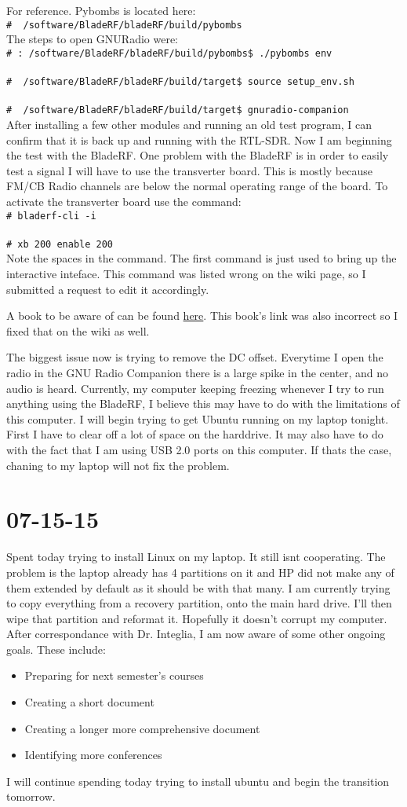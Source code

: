 \documentclass{article}
\newcommand{\shellcmd}[1]{\\\indent\indent\texttt{\footnotesize\# #1}\\}
\begin{document}
	For reference. Pybombs is located here:
	\shellcmd{~/software/BladeRF/bladeRF/build/pybombs}

	The steps to open GNURadio were:
	\shellcmd{:~/software/BladeRF/bladeRF/build/pybombs\$ ./pybombs env}
	\shellcmd{~/software/BladeRF/bladeRF/build/target\$ source setup\_env.sh }
	\shellcmd{~/software/BladeRF/bladeRF/build/target\$ gnuradio-companion} 

	After installing a few other modules and running an old test program, I can confirm that it is back up and running
	with the RTL-SDR. Now I am beginning the test with the BladeRF. One problem with the BladeRF is in order to easily
	test a signal I will have to use the transverter board. This is mostly because FM/CB Radio channels are below
	the normal operating range of the board. To activate the transverter board use the command:
	\shellcmd{bladerf-cli -i}
	\shellcmd{xb 200 enable 200} 
	Note the spaces in the command. The first command is just used to bring up the interactive inteface. This command was
	listed wrong on the wiki page, so I submitted a request to edit it accordingly. 

	A book to be aware of can be found 
	\href{http://people.scs.carleton.ca/~barbeau/SDRCRBook/index.shtml}{here}. This book's link was also incorrect
	so I fixed that on the wiki as well. 
	
	The biggest issue now is trying to remove the DC offset. Everytime I open the radio in the GNU Radio Companion there is a
	large spike in the center, and no audio is heard. Currently, my computer keeping freezing whenever I try to run
	anything using the BladeRF, I believe this may have to do with the limitations of this computer. I will begin trying to
	get Ubuntu running on my laptop tonight. First I have to clear off a lot of space on the harddrive. It may
	also have to do with the fact that I am using USB 2.0 ports on this computer. If thats the case, chaning to my laptop
	will not fix the problem.

	\section{07-15-15}
	Spent today trying to install Linux on my laptop. It still isnt cooperating. The problem is the laptop already has 4 
	partitions on it and HP did not make any of them extended by default as it should be with that many. I am currently
	trying to copy everything from a recovery partition, onto the main hard drive. I'll then wipe that partition and reformat
	it. Hopefully it doesn't corrupt my computer. After correspondance with Dr. Integlia, I am now aware of some other ongoing
	goals. These include:
	\begin{itemize}
	\item Preparing for next semester's courses
	\item Creating a short document
	\item Creating a longer more comprehensive document
	\item Identifying more conferences
	\end{itemize}
	I will continue spending today trying to install ubuntu and begin the transition tomorrow.
	
\end{document}
